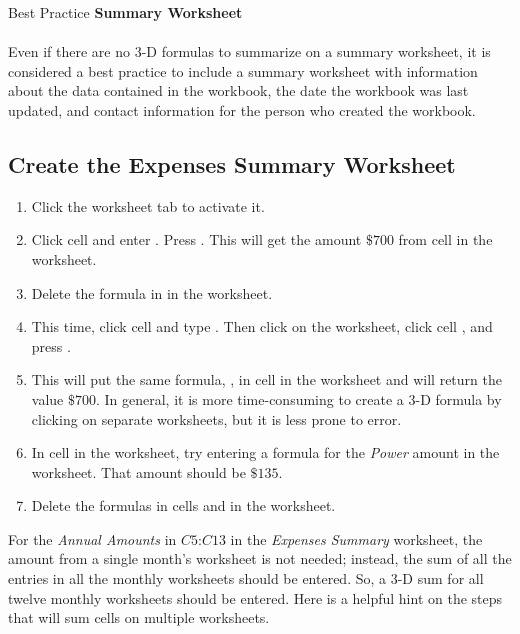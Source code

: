 \begin{center}
	\begin{infobox}{Best Practice}
		\textbf{Summary Worksheet}
		\\
		\\
		Even if there are no $ 3 $-D formulas to summarize on a summary worksheet, it is considered a best practice to include a summary worksheet with information about the data contained in the workbook, the date the workbook was last updated, and contact information for the person who created the workbook.
	\end{infobox}
\end{center}

\subsection{Create the Expenses Summary Worksheet}

\begin{enumerate}
	\item Click the  worksheet tab to activate it.
	\item Click cell  and enter . Press . This will get the amount $ \$700 $ from cell  in the  worksheet.
	\item Delete the formula in  in the  worksheet.
	\item This time, click cell  and type \fmtTyping{=}. Then click on the  worksheet, click cell , and press .
	\item This will put the same formula, , in cell  in the  worksheet and will return the value $ \$700 $. In general, it is more time-consuming to create a $ 3 $-D formula by clicking on separate worksheets, but it is less prone to error.
	\item In cell  in the  worksheet, try entering a formula for the \textit{Power} amount in the  worksheet. That amount should be $ \$135 $.
	\item Delete the formulas in cells  and  in the  worksheet.
\end{enumerate}

For the \textit{Annual Amounts} in $ C5 $:$ C13 $ in the \textit{Expenses Summary} worksheet, the amount from a single month's worksheet is not needed; instead, the sum of all the entries in all the monthly worksheets should be entered. So, a $ 3 $-D sum for all twelve monthly worksheets should be entered. Here is a helpful hint on the steps that will sum cells on multiple worksheets.

